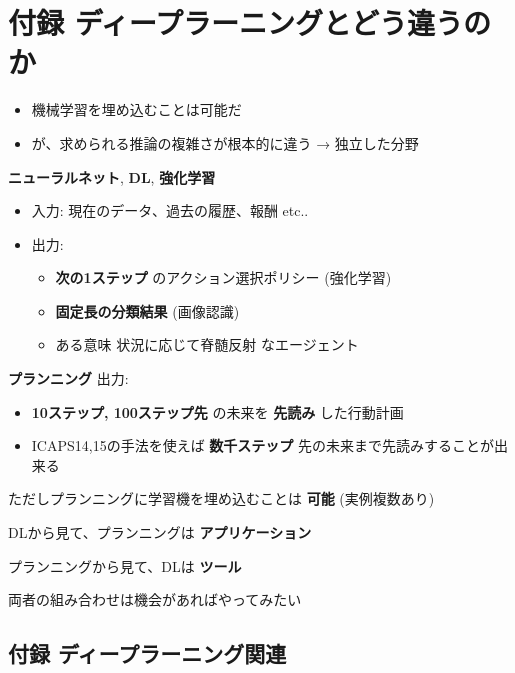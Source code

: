 \section{付録 ディープラーニングとどう違うのか}
\label{sec-11}

\begin{itemize}
\item 機械学習を埋め込むことは可能だ
\item が、求められる推論の複雑さが根本的に違う → 独立した分野
\end{itemize}

\begin{container-fluid}
\begin{row-fluid}
\begin{span7}
\textbf{ニューラルネット}, \textbf{DL}, \textbf{強化学習}
\begin{itemize}
\item 入力: 現在のデータ、過去の履歴、報酬 etc..
\item 出力:
\begin{itemize}
\item \textbf{次の1ステップ} のアクション選択ポリシー (強化学習)
\item \textbf{固定長の分類結果} (画像認識)
\item ある意味 状況に応じて脊髄反射 なエージェント
\end{itemize}
\end{itemize}
\end{span7}
\begin{span5}
\textbf{プランニング}
出力:
\begin{itemize}
\item \textbf{10ステップ, 100ステップ先} の未来を \textbf{先読み} した行動計画
\item ICAPS14,15の手法を使えば \textbf{数千ステップ} 先の未来まで先読みすることが出来る
\end{itemize}
\end{span5}
\end{row-fluid}
\end{container-fluid}

ただしプランニングに学習機を埋め込むことは \textbf{可能} (実例複数あり)

DLから見て、プランニングは \textbf{アプリケーション}

プランニングから見て、DLは \textbf{ツール}

両者の組み合わせは機会があればやってみたい

\subsection{付録 ディープラーニング関連}
\label{sec-11-1}

